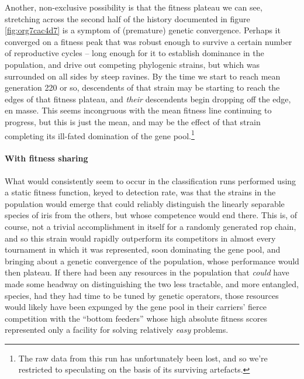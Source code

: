\documentclass[12pt,glossary]{dalthesis}
\begin{document}
Another, non-exclusive possibility is that the fitness plateau we can see,
stretching across the second half of the history documented in figure
\ref{fig:org7cac4d7} is a symptom of (premature) genetic convergence. 
Perhaps it converged on a fitness peak that was robust enough to survive
a certain number of reproductive cycles -- long enough for it to establish
dominance in the population, and drive out competing phylogenic strains, but 
which was surrounded on all sides by steep ravines. By the time we start to reach
mean generation 220 or so, descendents of that strain may be starting to reach
the edges of that fitness plateau, and \emph{their} descendents begin dropping off the
edge, en masse. This seems incongruous with the mean fitness line continuing to
progress, but this is just the mean, and may be the effect of that strain completing
its ill-fated domination of the gene pool.\footnote{The raw data from this run has unfortunately been lost, and so we're restricted
  to speculating on the basis of its surviving artefacts.}

\paragraph{With fitness sharing}
\label{sec:orgb4735b0}
\label{org762892f}

 What would consistently seem to occur in the classification runs performed
 using a static fitness function, keyed to detection rate, was that the
 strains in the population would emerge that could reliably distinguish the
 linearly separable species of iris from the others, but whose competence
 would end there. This is, of course, not a trivial accomplishment in itself
 for a randomly generated \gls{rop} chain, and so this strain would rapidly
 outperform its competitors in almost every tournament in which it was
 represented, soon dominating the gene pool, and bringing about a genetic
 convergence of the population, whose performance would then plateau. If there
 had been any resources in the population that \emph{could} have made some headway
 on distinguishing the two less tractable, and more entangled, species, had
they had time to be tuned by genetic operators, those resources would likely
have been expunged by the gene pool in their carriers' fierce competition with
the ``bottom feeders'' whose high absolute fitness scores represented only a
facility for solving relatively \emph{easy} problems.
\end{document}
